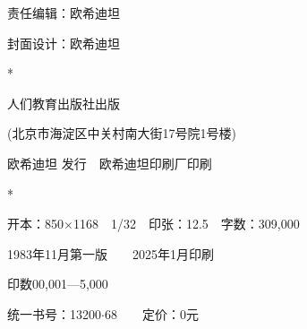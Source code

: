 
\begin{center}
  \fangsong\mbox{}

  \mbox{}\label{publish}

  责任编辑：欧希迪坦

  封面设计：欧希迪坦

  \vfill {}

  \normalsize {}

  \normalfont{} *

  人们教育出版社出版

   (北京市海淀区中关村南大街17号院1号楼)

  \normalsize 欧希迪坦%
  \hspace{0.2em}\hspace{0.2em}%
  发行~~欧希迪坦印刷厂印刷

  *

  开本：850$\times$1168~~1/32~~印张：12.5~~字数：309,000

  1983年11月第一版~~~~2025年1月印刷

  印数00,001—5,000

  \normalsize 统一书号：13200$\cdot$68~~~~定价：0元
\end{center}
\thispagestyle{empty}
\clearpage

